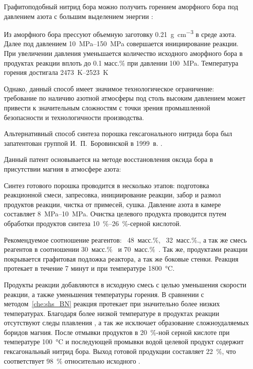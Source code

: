 Графитоподобный нитрид бора можно получить горением аморфного бора под давлением 
азота с большим выделением энергии \cite[]{loryan_nanosized_2009}:


Из аморфного бора прессуют объемную заготовку \SI{0.21}{\gram\per\cm^3} в среде
азота. Далее под давлением \SIrange{10}{150}{\mega\pascal} совершается
инициирование реакции. При увеличении давления   уменьшается количество
исходного аморфного бора в продуктах реакции вплоть до 0.1 масс.\% при давлении 
\SI{100}{\mega\pascal}. Температура горения достигала \SIrange{2473}{2523}{\kelvin}

Однако, данный способ имеет значимое технологическое ограничение: требование 
по наличию азотной атмосферы под столь высоким давлением может привести к значительным сложностям
с точки зрения промышленной безопасности и технологичности производства.

Альтернативный способ синтеза порошка гексагонального нитрида бора был запатентован 
группой И.~П.~Боровинской в 1999~в. \cite[]{__1999}.

Данный патент основывается на методе восстановления оксида бора в присутствии магния
в атмосфере азота:


Синтез готового порошка проводится в несколько этапов: подготовка реакционной смеси,
запресовка, инициирование реакции, забор и размол продуктов реакции, чистка от примесей,
сушка. Давление азота в камере составляет \SIrange{8}{10}{\mega\pascal}. Очистка 
целевого продукта проводится путем обработки продуктов синтеза 
\SIrange{10}{26}{\%}-серной кислотой.  

Рекомендуемое соотношение реагентов: ~48~масс.\%, ~32~масс.\%., 
а так же смесь реагентов в соотношении 30~масс.\%~ и 
70~масс.\%~. Так же, продуктами реакции покрывается графитовая подложка
реактора, а так же боковые стенки. Реакция протекает в течение 7 минут и при
температуре \SI{1800}{\degreeCelsius}.  

Продукты реакции добавляются в исходную смесь с целью уменьшения скорости реакции, 
а также уменьшения температуры горения. В сравнении с методом~\ref{che:shs_BN} 
реакция протекает при значительно более низких температурах. Благодаря более низкой
температуре в продуктах реакции отсутствуют следы плавления , а так же 
исключает образование сложноудаляемых боридов магния. После отмывки продуктов
в \SI{20}{\%}-ной серной кислоте при температуре \SI{100}{\degreeCelsius}
и последующей промывки водой целевой продукт содержит гексагональный нитрид бора.
Выход готовой продукции составляет \SI{22}{\%}, что соответствует \SI{98}{\%}  
относительно исходного . 

